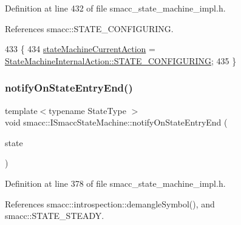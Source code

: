 Definition at line 432 of file smacc\+\_\+state\+\_\+machine\+\_\+impl.\+h.



References smacc\+::\+S\+T\+A\+T\+E\+\_\+\+C\+O\+N\+F\+I\+G\+U\+R\+I\+NG.


\begin{DoxyCode}
433   \{
434     \hyperlink{classsmacc_1_1ISmaccStateMachine_a654a98ba86c4c1013ac3c371f293d950}{stateMachineCurrentAction} = 
      \hyperlink{namespacesmacc_a0889aff43c93fe5285109819d2898144a32406d3560b9f36b3e6e3b84454e1be5}{StateMachineInternalAction::STATE\_CONFIGURING};
435   \}
\end{DoxyCode}
\mbox{\label{classsmacc_1_1ISmaccStateMachine_a856cf2d25d84659b974cccfbf44aeec9}} 
\subsubsection{\texorpdfstring{notify\+On\+State\+Entry\+End()}{notifyOnStateEntryEnd()}}
{\footnotesize\ttfamily template$<$typename State\+Type $>$ \\
void smacc\+::\+I\+Smacc\+State\+Machine\+::notify\+On\+State\+Entry\+End (\begin{DoxyParamCaption}\item[{State\+Type $\ast$}]{state }\end{DoxyParamCaption})}



Definition at line 378 of file smacc\+\_\+state\+\_\+machine\+\_\+impl.\+h.



References smacc\+::introspection\+::demangle\+Symbol(), and smacc\+::\+S\+T\+A\+T\+E\+\_\+\+S\+T\+E\+A\+DY.


